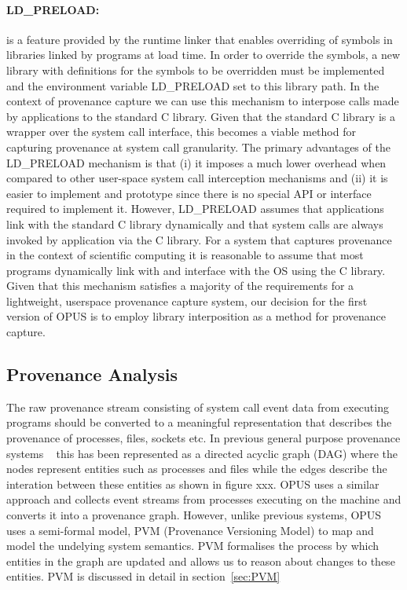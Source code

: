 \documentclass[withindex,glossary]{cam-thesis}
\begin{document}
\paragraph{LD\_PRELOAD:} is a feature provided by the runtime linker that enables overriding of symbols in libraries linked by programs at load time. In order to override the symbols, a new library with definitions for the symbols to be overridden must be implemented and the environment variable LD\_PRELOAD set to this library path. In the context of provenance capture we can use this mechanism to interpose calls made by applications to the standard C library. Given that the standard C library is a wrapper over the system call interface, this becomes a viable method for capturing provenance at system call granularity.
The primary advantages of the LD\_PRELOAD mechanism is that (i) it imposes a much lower overhead when compared to other user-space system call interception mechanisms and (ii) it is easier to implement and prototype since there is no special API or interface required to implement it.
However, LD\_PRELOAD assumes that applications link with the standard C library dynamically and that system calls are always invoked by application via the C library.
For a system that captures provenance in the context of scientific computing it is reasonable to assume that most programs dynamically link with and interface with the OS using the C library. Given that this mechanism satisfies a majority of the requirements for a lightweight, userspace provenance capture system, our decision for the first version of OPUS is to employ library interposition as a method for provenance capture.


\subsection{Provenance Analysis} %
The raw provenance stream consisting of system call event data from executing programs should be converted to a meaningful representation that describes the provenance of processes, files, sockets etc.
In previous general purpose provenance systems ~\cite{PASS, PASSv2} this has been represented as a directed acyclic graph (DAG) where the nodes represent entities such as processes and files while the edges describe the interation between these entities as shown in figure xxx.%
OPUS uses a similar approach and collects event streams from processes executing on the machine and converts it into a provenance graph.
However, unlike previous systems, OPUS uses a semi-formal model, PVM (Provenance Versioning Model) to map and model the undelying system semantics.
PVM formalises the process by which entities in the graph are updated and allows us to reason about changes to these entities.
PVM is discussed in detail in section~\ref{sec:PVM}
\end{document}
